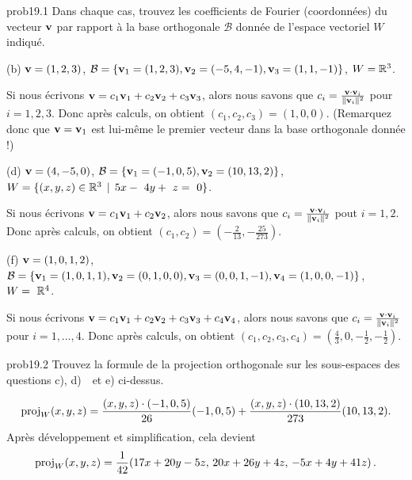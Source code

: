 
 


\begin{sol}{prob19.1} Dans chaque cas, trouvez les coefficients de Fourier (coordonn\'ees) du vecteur $\mathbf{v}$ par rapport à la base orthogonale $\mathcal B$ donnée de l'espace vectoriel $W$ indiqué.
\medskip

(b)  $\mathbf{v}=(1,2,3)$, $\mathcal B = \{\mathbf{v}_1=(1, 2 , 3 ),\mathbf{v}_2=(-5, 4, -1),\mathbf{v}_3=(1, 1, -1)\}$, $W=\mathbb{R}^3$.


\soln Si nous écrivons $\mathbf{v}= c_1 \mathbf{v}_1+c_2 \mathbf{v}_2+c_3 \mathbf{v}_3$, alors nous savons que 
$ c_i= \frac{\mathbf{v}\cdot \mathbf{v}_i}{\| \mathbf{v}_i\|^2}$ pour $i=1,2,3$. Donc après calculs, on obtient $(c_1, c_2, c_3)=(1,0,0)$. (Remarquez donc que $\mathbf{v}=\mathbf{v}_1$ est lui-même le premier vecteur dans la base orthogonale donnée !)
\medskip


(d) $\mathbf{v}=(4,-5,0)$, $\mathcal B = \{\mathbf{v}_1=(-1, 0, 5),\mathbf{v}_2=(10, 13, 2)\}$,   $W=\{(x,y,z)\in\mathbb{R}^3 \, \mid \, 5x-~4y+~z=~0\}$.


\soln Si nous écrivons $\mathbf{v}= c_1 \mathbf{v}_1+c_2 \mathbf{v}_2$, alors nous savons que 
$ c_i= \frac{\mathbf{v}\cdot \mathbf{v}_i}{\| \mathbf{v}_i\|^2}$ pout $i=1,2$. Donc après calculs, on obtient $(c_1, c_2)=(-\frac{2}{13},-\frac{25}{273})$. 
\medskip


(f) $\mathbf{v}=(1,0,1,2)$,  $\mathcal B =\{\mathbf{v}_1=(1, 0, 1, 1), \mathbf{v}_2=(0, 1, 0, 0), \mathbf{v}_3=(0, 0, 1, -1),\mathbf{v}_4=(1, 0, 0, -1)\}$, $W=~\mathbb{R}^4$.


\soln
Si nous écrivons $\mathbf{v}= c_1 \mathbf{v}_1+c_2 \mathbf{v}_2+c_3 \mathbf{v}_3+c_4 \mathbf{v}_4$, alors nous savons que 
$ c_i= \frac{\mathbf{v}\cdot \mathbf{v}_i}{\| \mathbf{v}_i\|^2}$ pour $i=1,\dots ,4$. Donc après calculs, on obtient $(c_1, c_2, c_3, c_4)=(\frac{4}{3},0,-\frac{1}{2},-\frac{1}{2})$.
\medskip

\end{sol}

\bigskip
\begin{sol}{prob19.2} Trouvez la formule de la projection orthogonale sur les sous-espaces des questions c), d)~\sov~et e) ci-dessus.


\soln  $$\operatorname{proj}_W(x,y,z)=\frac{(x,y,z)\cdot (-1, 0, 5)}{26}(-1, 0, 5)+\frac{(x,y,z)\cdot (10, 13, 2)}{273}(10, 13, 2).$$ Après d\'eveloppement et simplification, cela devient $$\operatorname{proj}_W(x,y,z)=\frac{1}{42}(17 x+20 y-5 z,\,20 x+26 y+4 z,\,-5 x+4 y+41 z)\,.$$
\medskip

\end{sol}

